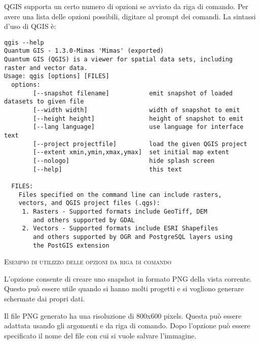 \nix QGIS supporta un certo numero di opzioni se avviato da riga di comando.
Per avere una lista delle opzioni possibili, digitare  al prompt dei comandi.
La sintassi d'uso di QGIS è:

\small
\begin{verbatim}
qgis --help
Quantum GIS - 1.3.0-Mimas 'Mimas' (exported)
Quantum GIS (QGIS) is a viewer for spatial data sets, including
raster and vector data.
Usage: qgis [options] [FILES]
  options:
        [--snapshot filename]           emit snapshot of loaded datasets to given file
        [--width width]                 width of snapshot to emit
        [--height height]               height of snapshot to emit
        [--lang language]               use language for interface text
        [--project projectfile]         load the given QGIS project
        [--extent xmin,ymin,xmax,ymax]  set initial map extent
        [--nologo]                      hide splash screen
        [--help]                        this text

  FILES:
    Files specified on the command line can include rasters,
    vectors, and QGIS project files (.qgs):
     1. Rasters - Supported formats include GeoTiff, DEM
        and others supported by GDAL
     2. Vectors - Supported formats include ESRI Shapefiles
        and others supported by OGR and PostgreSQL layers using
        the PostGIS extension
\end{verbatim}
\normalsize

\begin{Tip} \caption{\textsc{Esempio di utilizzo delle opzioni da riga di comando}}
\end{Tip}

L'opzione consente di creare uno snapshot in formato PNG della vista corrente.
Questo può essere utile quando si hanno molti progetti e si vogliono
generare schermate dai propri dati.

Il file PNG generato ha una risoluzione di 800x600 pixels. Questa può essere adattata
usando gli argomenti  e  da riga di comando. 
Dopo l'opzione  può essere specificato il nome del file con cui si vuole salvare l'immagine.

